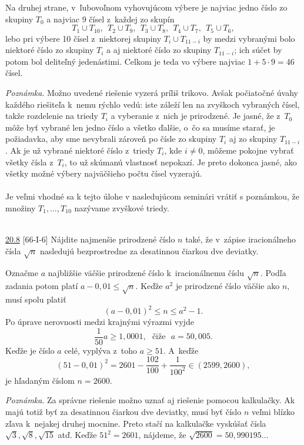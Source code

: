 Na druhej strane, v~ľubovoľnom vyhovujúcom výbere je najviac jedno číslo zo skupiny $T_0$ a najviac 9 čísel z~každej zo skupín
$$ T_1 \cup T_{10}, \ \ T_2 \cup T_9, \ \ T_3 \cup T_8, \ \  T_4 \cup T_7, \ \ T_5 \cup T_6,$$
lebo pri výbere 10 čísel z~niektorej skupiny $T_i \cup T_{11-i}$ by medzi vybranými bolo niektoré číslo zo skupiny $T_i$ a aj niektoré číslo zo skupiny $T_{11-i}$; ich súčet by potom bol deliteľný jedenástimi. Celkom je teda vo výbere najviac $1 + 5 \cdot 9 = 46$ čísel.

\textit{Poznámka}. Možno uvedené  riešenie vyzerá príliš trikovo. Avšak počiatočné úvahy každého riešiteľa k~nemu rýchlo vedú: iste záleží len na zvyškoch vybraných čísel, takže rozdelenie na triedy $T_i$ a vyberanie z~nich je prirodzené. Je jasné, že z~$T_0$ môže byť vybrané len jedno číslo a všetko ďalšie, o~čo sa musíme starať, je požiadavka, aby sme nevybrali zároveň po čísle zo skupiny $T_i$ aj zo skupiny $T_{11-i}$. Ak je už vybrané niektoré číslo z~triedy $T_i$, kde $i\neq 0$, môžeme pokojne vybrať všetky čísla z~$T_i$, to už skúmanú vlastnosť nepokazí. Je preto dokonca jasné, ako všetky možné výbery najväčšieho počtu čísel vyzerajú.\\
\\
\kom Je veľmi vhodné sa k tejto úlohe v nasledujúcom seminári vrátiť s poznámkou, že množiny $T_1, \ldots, T_{10}$ nazývame zvyškové triedy. \\
\\
\begin{tcolorbox}[breakable,notitle,boxrule=0pt,colback=light-gray,colframe=light-gray]\ul{20.8} [66-I-6]
Nájdite najmenšie prirodzené číslo $n$ také, že v~zápise iracionálneho čísla $\sqrt{n}$ nasledujú bezprostredne za desatinnou čiarkou dve deviatky.

\end{tcolorbox}

\rieh Označme $a$ najbližšie väčšie prirodzené číslo k~iracionálnemu číslu $\sqrt{n}$. Podľa zadania potom platí $a - 0,01 \leq \sqrt{n}$. Keďže $a^2$ je prirodzené číslo väčšie ako $n$, musí spolu platiť
$$(a - 0,01)^2 \leq n \leq a^2 - 1.$$
Po úprave nerovnosti medzi krajnými výrazmi vyjde
$$\frac{1}{50} a \geq 1,000 1, \ \ \ \text{čiže} \ \ \  a = 50,005.$$
Keďže je číslo $a$ celé, vyplýva z~toho $a \geq 51$. A~keďže
$$(51 - 0,01)^2= 2 601 -\frac{102}{100}+\frac{1}{100^2}\in (2 599, 2 600),$$
je hľadaným číslom $n = 2 600$.

\textit{Poznámka}. Za správne riešenie možno uznať aj riešenie pomocou kalkulačky. Ak majú totiž byť za desatinnou čiarkou dve deviatky, musí byť číslo $n$ veľmi blízko zľava k~nejakej druhej mocnine. Preto stačí na kalkulačke vyskúšať čísla $\sqrt{3}, \sqrt{8}, \sqrt{15}$ atď. Keďže $51^2 = 2601$, nájdeme, že $\sqrt{2600} = 50,990 195\ldots$
